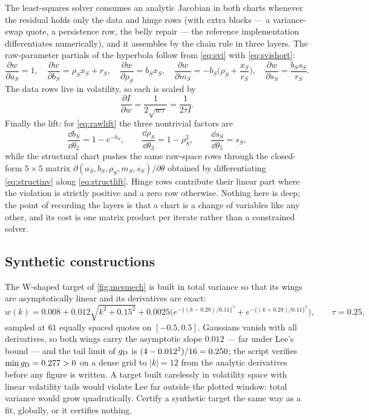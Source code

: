 The least-squares solver consumes an analytic Jacobian in both charts
whenever the residual holds only the data and hinge rows (with extra
blocks --- a variance-swap quote, a persistence row, the belly
repair --- the reference implementation differentiates numerically),
and it assembles by the chain rule in three layers.  The raw-parameter
partials of the hyperbola follow from \eqref{eq:svi} with
\eqref{eq:svishort}:
\begin{equation}
\frac{\partial w}{\partial a_S}=1,\quad
\frac{\partial w}{\partial b_S}=\rho_Sx_S+r_S,\quad
\frac{\partial w}{\partial\rho_S}=b_Sx_S,\quad
\frac{\partial w}{\partial m_S}=-b_S\Big(\rho_S+\frac{x_S}{r_S}\Big),\quad
\frac{\partial w}{\partial s_S}=\frac{b_Ss_S}{r_S}.
\label{eq:svipartials}
\end{equation}
The data rows live in volatility, so each is scaled by
\begin{equation}
\frac{\partial I}{\partial w}=\frac{1}{2\sqrt{w\tau}}=\frac{1}{2\tau I}.
\label{eq:ivchain}
\end{equation}
Finally the lift: for \eqref{eq:rawlift} the three nontrivial factors
are
\begin{equation}
\frac{\dd b_S}{\dd\theta_2}=1-e^{-b_S},\qquad
\frac{\dd\rho_S}{\dd\theta_3}=1-\rho_S^2,\qquad
\frac{\dd s_S}{\dd\theta_5}=s_S,
\label{eq:liftchain}
\end{equation}
while the structural chart pushes the same raw-space rows through the
closed-form $5\times5$ matrix
$\partial(a_S,b_S,\rho_S,m_S,s_S)/\partial\theta$ obtained by
differentiating \eqref{eq:structinv} along \eqref{eq:structlift}.
Hinge rows contribute their linear part where the violation is
strictly positive and a zero row otherwise.  Nothing here is deep; the
point of recording the layers is that a chart is a change of variables
like any other, and its cost is one matrix product per iterate rather
than a constrained solver.

\subsection*{Synthetic constructions}

The W-shaped target of \cref{fig:mcsmech} is built in total variance
so that its wings are asymptotically linear and its derivatives are
exact:
\[
w(k)=0.008+0.012\sqrt{k^2+0.15^2}
+0.0025\big(e^{-\{(k-0.28)/0.11\}^2}+e^{-\{(k+0.28)/0.11\}^2}\big),
\qquad \tau=0.25,
\]
sampled at $61$ equally spaced quotes on $[-0.5,0.5]$.  Gaussians
vanish with all derivatives, so both wings carry the asymptotic slope
$0.012$ --- far under Lee's bound --- and the tail limit of
$g_{\rm D}$ is $(4-0.012^2)/16=0.250$; the script
verifies $\min g_{\rm D}=0.277>0$ on a dense grid to
$|k|=12$ from the analytic derivatives before any figure is written.
A target built carelessly in volatility space with linear volatility
tails would violate Lee far outside the plotted window: total variance
would grow quadratically.  Certify a synthetic target the same way as
a fit, globally, or it certifies nothing.

